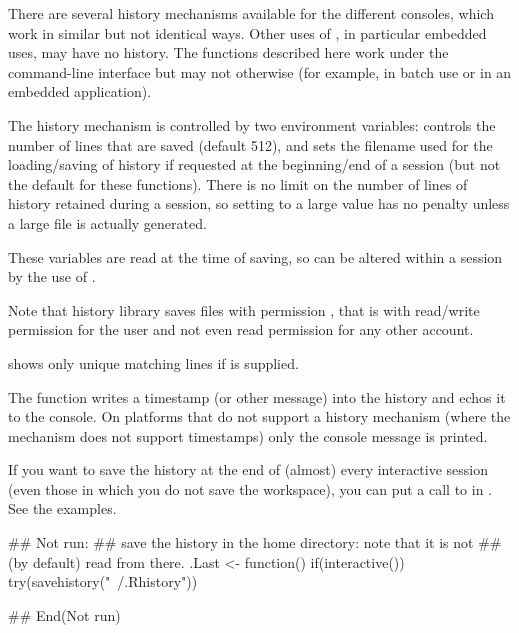 %
\begin{Details}\relax
There are several history mechanisms available for the different \R{}
consoles, which work in similar but not identical ways.  Other uses of
\R{}, in particular embedded uses, may have no history.
The functions described here work under the 
command-line interface but may not otherwise (for example, in batch
use or in an embedded application).

The  history mechanism is controlled by two environment
variables:  controls the number of lines that are
saved (default 512), and  sets the filename used for
the loading/saving of history if requested at the beginning/end of a
session (but not the default for these functions).  There is no limit
on the number of lines of history retained during a session, so
setting  to a large value has no penalty unless a
large file is actually generated.

These variables are read at the time of saving, so can be altered
within a session by the use of .

Note that  history library saves files with permission
, that is with read/write permission for the user and not
even read permission for any other account.

 shows only unique matching lines if  is
supplied.

The  function writes a timestamp (or other message)
into the history and echos it to the console.  On platforms that do not
support a history mechanism (where the mechanism does not support
timestamps) only the console message is printed.
\end{Details}
%
\begin{Note}\relax
If you want to save the history at the end of (almost) every
interactive session (even those in which you do not save the
workspace), you can put a call to  in
.  See the examples.
\end{Note}
%
\begin{Examples}
\begin{ExampleCode}
## Not run: 
## save the history in the home directory: note that it is not
## (by default) read from there.
.Last <- function()
    if(interactive()) try(savehistory("~/.Rhistory"))

## End(Not run)
\end{ExampleCode}
\end{Examples}
